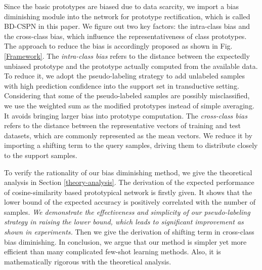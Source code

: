 \documentclass[runningheads]{llncs}
\begin{document}
Since the basic prototypes are biased due to data scarcity, we import a bias diminishing module into the network for prototype rectification, which is called BD-CSPN in this paper. 
We figure out two key factors: the intra-class bias and the cross-class bias, which influence the representativeness of class prototypes. The approach to reduce the bias is accordingly proposed as shown in Fig. \ref{Framework}. The \textit{intra-class bias} refers to the distance between the expectedly unbiased prototype and the prototype actually computed from the available data. To reduce it, we adopt the pseudo-labeling strategy to add unlabeled samples with high prediction confidence into the support set in transductive setting. Considering that some of the pseudo-labeled samples are possibly misclassified, we use the weighted sum as the modified prototypes instead of simple averaging. It avoids bringing larger bias into prototype computation. The \textit{cross-class bias} refers to the distance between the representative vectors of training and test datasets, which are commonly represented as the mean vectors. We reduce it by importing a shifting term  to the query samples, driving them to distribute closely to the support samples. 

To verify the rationality of our bias diminishing method, we give the theoretical analysis in Section \ref{theory-analysis}. The derivation of the expected performance of cosine-similarity based prototypical network is firstly given. It shows that the lower bound of the expected accuracy is positively correlated with the number of samples. \textit{We demonstrate the effectiveness and simplicity of our pseudo-labeling strategy in raising the lower bound, which leads to significant improvement as shown in experiments.} Then we give the derivation of shifting term  in cross-class bias diminishing.
In conclusion, we argue that our method is simpler yet more efficient than many complicated few-shot learning methods. Also, it is mathematically rigorous with the theoretical analysis. 
\end{document}
